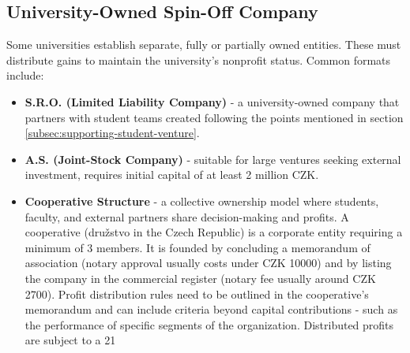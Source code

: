 \subsection{University-Owned Spin-Off Company}
Some universities establish separate, fully or partially owned entities. These must distribute gains to maintain the university’s nonprofit status. Common formats include:
\begin{itemize}
    \item \textbf{S.R.O. (Limited Liability Company)} - a university-owned company that partners with student teams created following the points mentioned in section \ref{subsec:supporting-student-venture}.
    \item \textbf{A.S. (Joint-Stock Company)} - suitable for large ventures seeking external investment, requires initial capital of at least 2 million CZK.
    \item \textbf{Cooperative Structure }- a collective ownership model where students, faculty, and external partners share decision-making and profits. A cooperative (družstvo in the Czech Republic) is a corporate entity requiring a minimum of 3 members. It is founded by concluding a memorandum of association (notary approval usually costs under CZK 10000) and by listing the company in the commercial register (notary fee usually around CZK 2700). Profit distribution rules need to be outlined in the cooperative’s memorandum and can include criteria beyond capital contributions  - such as the performance of specific segments of the organization. Distributed profits are subject to a 21%
\end{itemize}
